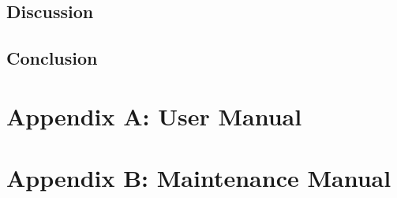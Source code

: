 \documentclass{pdfmx4020}
\begin{document}

  \section{Discussion} %
  \label{sec:discussion}
  

  \section{Conclusion} %
  \label{sec:conclusion}
  




\chapter*{Appendix A: User Manual}


\chapter*{Appendix B: Maintenance Manual}
\end{document}
